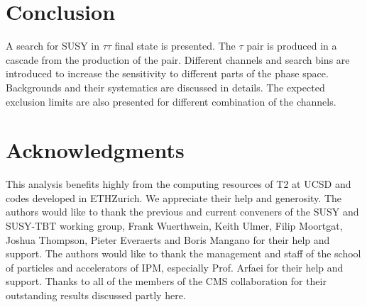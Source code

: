 \section{Conclusion}
\label{sect:conclusion}
A search for SUSY in $\tau\tau$ final state is presented. The $\tau$ pair is produced in a cascade from the production of the \PSGcpDo pair.
Different channels and search bins are introduced to increase the sensitivity to different parts of the phase space. 
Backgrounds and their systematics are discussed in details. The expected exclusion limits are also presented for different combination of the 
channels.

\section{Acknowledgments}
This analysis benefits highly from the computing resources of T2 at UCSD and codes developed in ETHZurich. 
We appreciate their help and generosity.
The authors would like to thank the previous and current conveners of the SUSY and SUSY-TBT working group, Frank Wuerthwein, Keith Ulmer, Filip Moortgat, Joshua Thompson, Pieter Everaerts and Boris Mangano for their help and support. 
The authors would like to thank the management and staff of the school of particles 
and accelerators of IPM, especially Prof. Arfaei for their help and support. 
Thanks to all of the members of
the CMS collaboration for their outstanding results discussed partly here.
